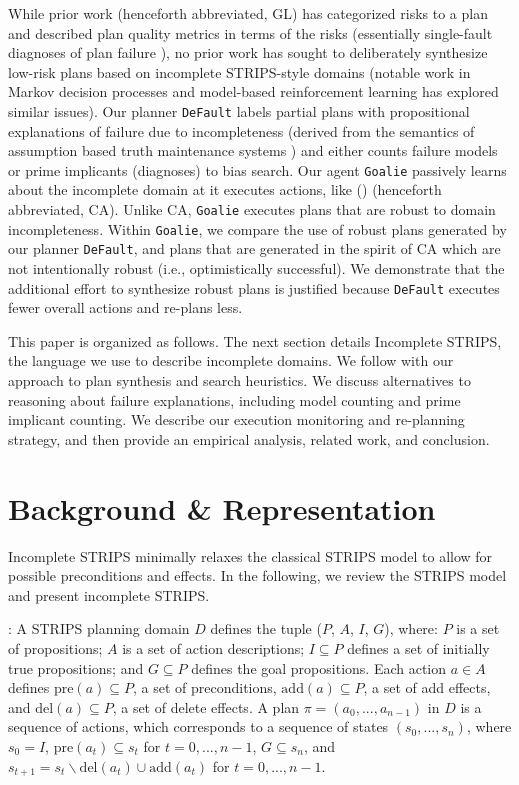 \documentclass[letterpaper]{article}
\def\und#1{\noindent{\bf #1}:}
\def\default{{\tt DeFault}}
\def\goalie{{\tt Goalie}}
\def\citep#1{\cite{#1}}
\def\citet#1{\citeauthor{#1} (\citeyear{#1})}
\begin{document}
While prior work \citep{Garland02} (henceforth abbreviated, GL) has categorized
risks to a plan and described plan quality metrics in terms of the risks
(essentially single-fault diagnoses of plan failure \citep{dekleer}), no prior
work has sought to deliberately synthesize low-risk plans based on incomplete
STRIPS-style domains (notable work in Markov decision processes
\citep{NE:05}  and model-based reinforcement learning \citep{citeulike:112017}
has explored similar issues).  Our planner \default{} labels partial plans with
propositional explanations of failure due to incompleteness (derived from the
semantics of assumption based truth maintenance systems \cite{USU-CS-TR-11-001})
and either counts failure models or prime implicants (diagnoses) to bias search.
Our agent \goalie{} passively learns about the incomplete domain at it executes
actions, like \citet{DBLP:conf/aips/ChangA06} (henceforth abbreviated, CA).
Unlike CA, \goalie{} executes plans that are robust to domain
incompleteness.  Within \goalie{}, we compare the use of robust plans generated
by our planner \default{}, and plans that are generated in the spirit of CA
which are not intentionally robust (i.e., optimistically successful).  We
demonstrate that the additional effort to synthesize robust plans is justified
because \default{} executes fewer overall actions and re-plans less.

This paper is organized as follows.  The next section details Incomplete STRIPS,
the language we use to describe incomplete domains.  We follow with our approach
to plan synthesis and search heuristics.  We discuss alternatives to reasoning
about failure explanations, including model counting and prime implicant
counting.  We describe our execution monitoring and re-planning strategy, and
then provide an empirical analysis, related work, and conclusion.
  

\section{Background \& Representation}\label{sec:background}

Incomplete STRIPS minimally relaxes the classical STRIPS model to allow for
possible preconditions and effects.  In the following, we review the STRIPS
model and present incomplete STRIPS.

\und{STRIPS Domains} A STRIPS  \citep{strips} planning domain $D$  defines the
tuple ($P$, $A$, $I$, $G$), where: $P$ is a set of propositions; $A$ is a set of
action descriptions; $I \subseteq P$ defines a set of initially true
propositions; and  $G \subseteq P$ defines the goal propositions.  Each action
$a \in A$ defines $\text{pre}(a) \subseteq P$, a set of preconditions,
$\text{add}(a) \subseteq P$, a set of add effects, and $\text{del}(a) \subseteq
P$, a set of delete effects. A plan $\pi = (a_0, ..., a_{n-1})$ in $D$ is a
sequence of actions, which corresponds to a sequence of states $(s_0, ...,
s_n)$, where $s_0 = I$, $\text{pre}(a_t) \subseteq s_t$ for $t = 0,..., n-1$, $G
\subseteq s_n$, and $s_{t+1} = s_t \backslash \text{del}(a_t) \cup
\text{add}(a_t)$ for $t = 0,..., n-1$.
\end{document}

